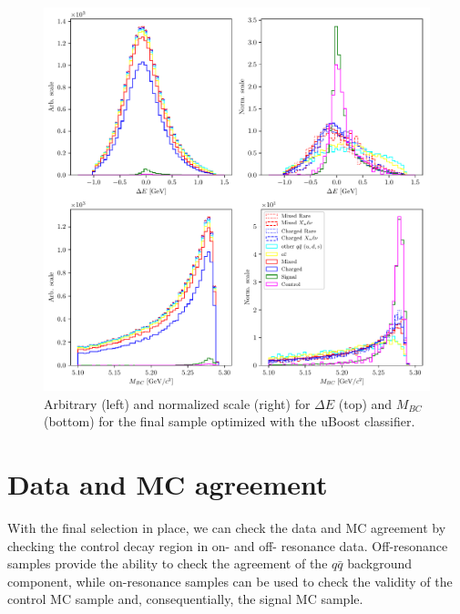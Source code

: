 \documentclass[  headings=standardclasses,
  headings=big,oneside,a4paper,openany,12pt]{scrbook}
\begin{document}
\begin{figure}[H]
\centering
\captionsetup{width=0.8\linewidth}
\includegraphics[width=\linewidth]{fig/opt_1dc}
\caption{Arbitrary (left) and normalized scale (right) for $\Delta E$ (top) and $M_{BC}$ (bottom) for the final sample optimized with the uBoost classifier.}
\label{fig:opt1dc}
\end{figure} 

\section{Data and MC agreement}

With the final selection in place, we can check the data and MC agreement by checking the control decay region in on- and off- resonance data. Off-resonance samples provide the ability to check the agreement of the $q\bar q$ background component, while on-resonance samples can be used to check the validity of the control MC sample and, consequentially, the signal MC sample.
\end{document}
